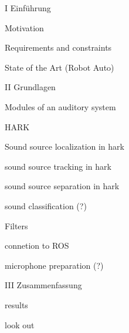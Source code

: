 I Einführung

Motivation

Requirements and constraints 

State of the Art (Robot Auto)


II Grundlagen

Modules of an auditory system

HARK

Sound source localization in hark

sound source tracking in hark

sound source separation in hark

sound classification (?)

Filters

connetion to ROS

microphone preparation (?)


III Zusammenfassung

results

look out